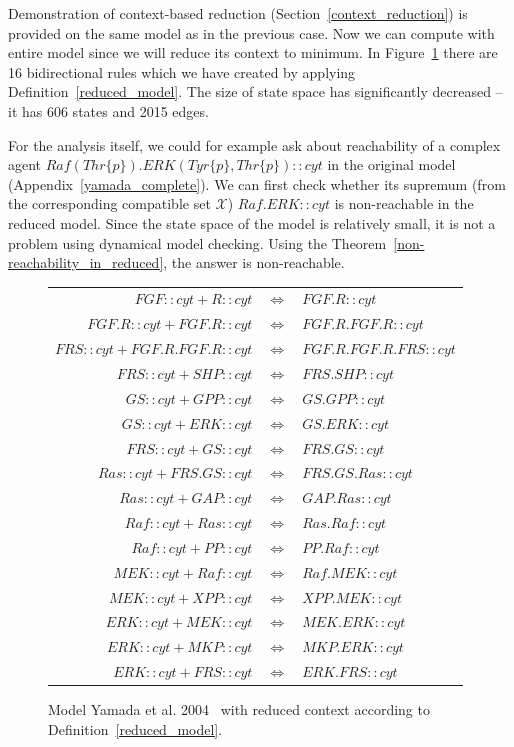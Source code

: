 \documentclass[12pt, twoside]{fithesis2} %
\begin{document}
Demonstration of context-based reduction (Section~\ref{context_reduction}) is provided on the same model as in the previous case. Now we can compute with entire model since we will reduce its context to minimum. In Figure~\ref{reduced_yamada} there are 16 bidirectional rules which we have created by applying Definition~\ref{reduced_model}. The size of state space has significantly decreased -- it has 606 states and 2015 edges.

For the analysis itself, we could for example ask about reachability of a complex agent {\small $Raf(Thr\{p\}).ERK(Tyr\{p\},Thr\{p\})::cyt$} in the original model (Appendix~\ref{yamada_complete}). We can first check whether its supremum (from the corresponding compatible set $\mathscr{X}$) {\small $Raf.ERK::cyt$} is non-reachable in the reduced model. Since the state space of the model is relatively small, it is not a problem using dynamical model checking. Using the Theorem~\ref{non-reachability_in_reduced}, the answer is non-reachable.

\begin{figure}[!h]
\begin{center}
{\small
\begin{tabular}{r c l}
$FGF::cyt + R::cyt $ & $ \Leftrightarrow $ & $ FGF.R::cyt$\\
$FGF.R::cyt + FGF.R::cyt $ & $ \Leftrightarrow $ & $ FGF.R.FGF.R::cyt$\\
$FRS::cyt + FGF.R.FGF.R::cyt $ & $ \Leftrightarrow $ & $ FGF.R.FGF.R.FRS::cyt$\\
$FRS::cyt + SHP::cyt $ & $ \Leftrightarrow $ & $ FRS.SHP::cyt$\\
$GS::cyt + GPP::cyt $ & $ \Leftrightarrow $ & $ GS.GPP::cyt$\\
$GS::cyt + ERK::cyt $ & $ \Leftrightarrow $ & $ GS.ERK::cyt$\\
$FRS::cyt + GS::cyt $ & $ \Leftrightarrow $ & $ FRS.GS::cyt$\\
$Ras::cyt + FRS.GS::cyt $ & $ \Leftrightarrow $ & $ FRS.GS.Ras::cyt$\\
$Ras::cyt + GAP::cyt $ & $ \Leftrightarrow $ & $ GAP.Ras::cyt$\\
$Raf::cyt + Ras::cyt $ & $ \Leftrightarrow $ & $ Ras.Raf::cyt$\\
$Raf::cyt + PP::cyt $ & $ \Leftrightarrow $ & $ PP.Raf::cyt$\\
$MEK::cyt + Raf::cyt $ & $ \Leftrightarrow $ & $ Raf.MEK::cyt$\\
$MEK::cyt + XPP::cyt $ & $ \Leftrightarrow $ & $ XPP.MEK::cyt$\\
$ERK::cyt + MEK::cyt $ & $ \Leftrightarrow $ & $ MEK.ERK::cyt$\\
$ERK::cyt + MKP::cyt $ & $ \Leftrightarrow $ & $ MKP.ERK::cyt$\\
$ERK::cyt + FRS::cyt $ & $ \Leftrightarrow $ & $ ERK.FRS::cyt$\\
\end{tabular}
}
\end{center}
\caption{Model Yamada et al. 2004~\cite{yamada2004model} with reduced context according to Definition~\ref{reduced_model}.}\label{reduced_yamada}
\end{figure}
\end{document}
